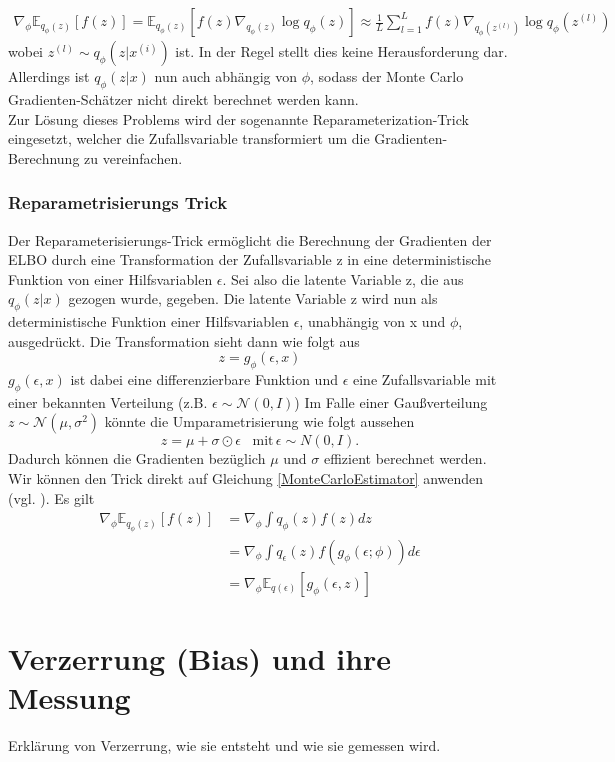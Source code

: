 \documentclass[%
thesis=student,%
coverpage=false,%
titlepage=false,%
headmarks=true, %
german,%
font=libertine, %
math=newpxtx, %
BCOR=5mm,%
coverBCOR=11mm%
]{tumbook}
\theoremstyle{break}
\begin{document}
\begin{align}
 \nabla_\phi \mathbb{E}_{q_\phi(z)}[f(z)]= \mathbb{E}_{q_\phi(z)}[f(z)\nabla_{q_\phi(z)}\log q_\phi(z)] \approx \frac{1}{L} \sum_{l=1}^{L}f(z)\nabla_{q_\phi(z^{(l)})}\log q_\phi(z^{(l)}) \label{MonteCarloEstimator}
\end{align}
wobei $z^{(l)} \sim q_\phi(z|x^{(i)})$ ist. 
In der Regel stellt dies keine Herausforderung dar. Allerdings ist $q_\phi(z|x)$ nun auch abhängig von  $\phi$, sodass der Monte Carlo Gradienten-Schätzer nicht direkt berechnet werden kann. \\
Zur Lösung dieses Problems wird der sogenannte Reparameterization-Trick eingesetzt, welcher die Zufallsvariable transformiert um die Gradienten-Berechnung zu vereinfachen.  
\subsubsection{Reparametrisierungs Trick}
Der Reparameterisierungs-Trick ermöglicht die Berechnung der Gradienten der ELBO durch eine Transformation der Zufallsvariable z in eine deterministische Funktion von einer Hilfsvariablen $\epsilon$.
Sei also die latente Variable z, die aus $q_\phi(z|x)$ gezogen wurde, gegeben. Die latente Variable z wird nun als deterministische Funktion einer Hilfsvariablen $\epsilon$, unabhängig von x und $\phi$, ausgedrückt. 
Die Transformation sieht dann wie folgt aus
$$ z = g_\phi(\epsilon, x)$$
$g_\phi(\epsilon,x) $ ist dabei eine differenzierbare Funktion und $\epsilon$ eine Zufallsvariable mit einer bekannten Verteilung (z.B. $\epsilon \sim \mathcal{N}(0,I)$)
Im Falle einer Gaußverteilung $z \sim \mathcal{N}(\mu, \sigma^2)$ könnte die Umparametrisierung wie folgt aussehen 
$$z=\mu + \sigma \odot \epsilon \hspace{10pt}\text{mit} \hspace{2pt} \epsilon\sim N(0,I).$$ 
Dadurch können die Gradienten bezüglich $\mu$ und $\sigma$ effizient berechnet werden.
\\
Wir können den Trick direkt auf Gleichung \ref{MonteCarloEstimator} anwenden (vgl. \cite{MonteCarloEstimation}). Es gilt
\begin{align}
	 \nabla_\phi \mathbb{E}_{q_\phi(z)}[f(z)] &= \nabla_\phi \int q_\phi(z) f(z) dz \\
	 &= \nabla_\phi \int q_\epsilon(z) f(g_\phi(\epsilon;\phi)) d\epsilon \\
	 &= \nabla_\phi \mathbb{E}_{q(\epsilon)}[g_\phi(\epsilon,z)]
\end{align}
\section{Verzerrung (Bias) und ihre Messung}
Erklärung von Verzerrung, wie sie entsteht und wie sie gemessen wird.
\end{document}
